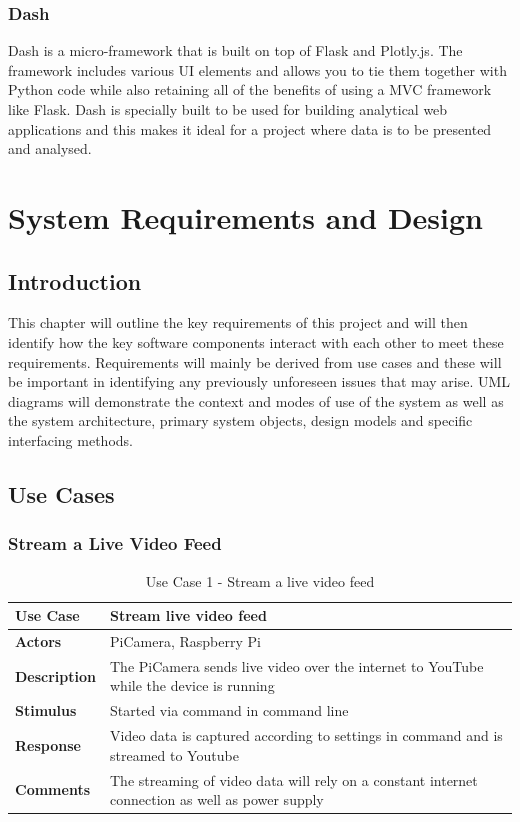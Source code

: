 \documentclass[10pt,a4paper]{article}
\begin{document}
\subsubsection{Dash\citep{website:dash}}
Dash is a micro-framework that is built on top of Flask and Plotly.js. The framework includes various UI elements and allows you to tie them together with Python code while also retaining all of the benefits of using a MVC framework like Flask. Dash is specially built to be used for building analytical web applications and this makes it ideal for a project where data is to be presented and analysed. 

\pagebreak
\section{System Requirements and Design}
\subsection{Introduction}
This chapter will outline the key requirements of this project and will then identify how the key software components interact with each other to meet these requirements. Requirements will mainly be derived from use cases and these will be important in identifying any previously unforeseen issues that may arise. UML diagrams will demonstrate the context and modes of use of the system as well as the system architecture, primary system objects, design models and specific interfacing methods. 

\subsection{Use Cases}
\subsubsection{Stream a Live Video Feed}
\begin{table}[h!]
\centering
\begin{tabular}{p{2cm}p{9cm}}
\toprule
\textbf{Use Case}    & Stream live video feed                                                                          \\ \midrule
\textbf{Actors}      & PiCamera, Raspberry Pi                                                                          \\
\textbf{Description} & The PiCamera sends live video over the internet to YouTube while the device is running         \\
\textbf{Stimulus}    & Started via command in command line                                                             \\
\textbf{Response}    & Video data is captured according to settings in command and is streamed to Youtube              \\
\textbf{Comments}    & The streaming of video data will rely on a constant internet connection as well as power supply \\ \bottomrule
\end{tabular}
\caption{Use Case 1 - Stream a live video feed}
\label{tab:useCase1}
\end{table}
\end{document}
